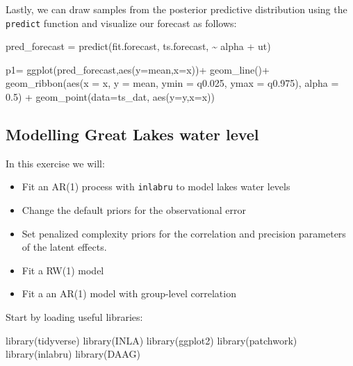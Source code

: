 \documentclass[
  letterpaper,
  DIV=11,
  numbers=noendperiod]{scrartcl}
\newenvironment{Shaded}{\begin{snugshade}}{\end{snugshade}}
\newcommand{\AttributeTok}[1]{\textcolor[rgb]{0.40,0.45,0.13}{#1}}
\newcommand{\FloatTok}[1]{\textcolor[rgb]{0.68,0.00,0.00}{#1}}
\newcommand{\FunctionTok}[1]{\textcolor[rgb]{0.28,0.35,0.67}{#1}}
\newcommand{\NormalTok}[1]{\textcolor[rgb]{0.00,0.23,0.31}{#1}}
\newcommand{\OtherTok}[1]{\textcolor[rgb]{0.00,0.23,0.31}{#1}}
\newcommand{\SpecialCharTok}[1]{\textcolor[rgb]{0.37,0.37,0.37}{#1}}
\begin{document}
Lastly, we can draw samples from the posterior predictive distribution
using the \texttt{predict} function and visualize our forecast as
follows:

\begin{Shaded}
\begin{Highlighting}[]
\NormalTok{pred\_forecast }\OtherTok{=} \FunctionTok{predict}\NormalTok{(fit.forecast, ts.forecast, }\SpecialCharTok{\textasciitilde{}}\NormalTok{ alpha }\SpecialCharTok{+}\NormalTok{ ut)}

\NormalTok{p1}\OtherTok{=} \FunctionTok{ggplot}\NormalTok{(pred\_forecast,}\FunctionTok{aes}\NormalTok{(}\AttributeTok{y=}\NormalTok{mean,}\AttributeTok{x=}\NormalTok{x))}\SpecialCharTok{+}
  \FunctionTok{geom\_line}\NormalTok{()}\SpecialCharTok{+}
    \FunctionTok{geom\_ribbon}\NormalTok{(}\FunctionTok{aes}\NormalTok{(}\AttributeTok{x =}\NormalTok{ x, }\AttributeTok{y =}\NormalTok{ mean, }\AttributeTok{ymin =}\NormalTok{ q0}\FloatTok{.025}\NormalTok{, }\AttributeTok{ymax =}\NormalTok{ q0}\FloatTok{.975}\NormalTok{),}
                \AttributeTok{alpha =} \FloatTok{0.5}\NormalTok{) }\SpecialCharTok{+}
  \FunctionTok{geom\_point}\NormalTok{(}\AttributeTok{data=}\NormalTok{ts\_dat, }\FunctionTok{aes}\NormalTok{(}\AttributeTok{y=}\NormalTok{y,}\AttributeTok{x=}\NormalTok{x))}
\end{Highlighting}
\end{Shaded}

\subsection{Modelling Great Lakes water
level}\label{modelling-great-lakes-water-level}

In this exercise we will:

\begin{itemize}
\item
  Fit an AR(1) process with \texttt{inlabru} to model lakes water levels
\item
  Change the default priors for the observational error
\item
  Set penalized complexity priors for the correlation and precision
  parameters of the latent effects.
\item
  Fit a RW(1) model
\item
  Fit a an AR(1) model with group-level correlation
\end{itemize}

Start by loading useful libraries:

\begin{Shaded}
\begin{Highlighting}[]
\FunctionTok{library}\NormalTok{(tidyverse) }
\FunctionTok{library}\NormalTok{(INLA) }
\FunctionTok{library}\NormalTok{(ggplot2)}
\FunctionTok{library}\NormalTok{(patchwork) }
\FunctionTok{library}\NormalTok{(inlabru)}
\FunctionTok{library}\NormalTok{(DAAG)}
\end{Highlighting}
\end{Shaded}
\end{document}
